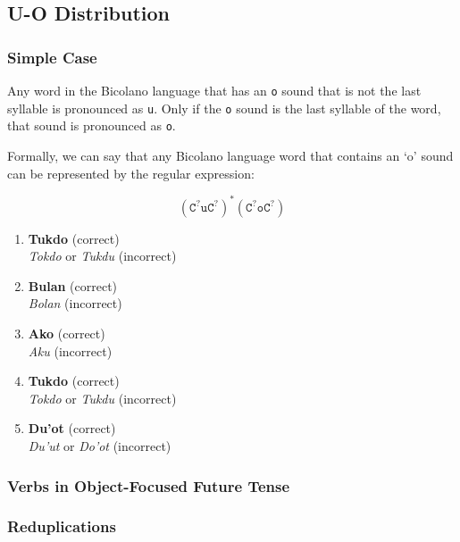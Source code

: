 \subsection{U-O Distribution}

\subsubsection{Simple Case}
Any word in the Bicolano language that has an \texttt{o} sound that is not the last syllable is pronounced as \texttt{u}. Only if the \texttt{o} sound is the last syllable of the word, that sound is pronounced as \texttt{o}. 

Formally, we can say that any Bicolano language word that contains an ‘o’ sound can be represented by the regular expression:

\[
    \left(\texttt{C}^?\texttt{uC}^?\right)^* \left(\texttt{C}^?\texttt{oC}^?\right)
\]

\begin{example}
\end{example}

\begin{enumerate}
    \item \textbf{Tukdo} (correct) \\
    \textit{Tokdo} or \textit{Tukdu} (incorrect) \\
    \item \textbf{Bulan} (correct) \\
    \textit{Bolan} (incorrect) \\
    \item \textbf{Ako} (correct) \\
    \textit{Aku} (incorrect) \\
    \item \textbf{Tukdo} (correct) \\
    \textit{Tokdo} or \textit{Tukdu} (incorrect) \\
    \item \textbf{Du'ot} (correct) \\
    \textit{Du'ut} or \textit{Do'ot} (incorrect) \\
\end{enumerate}

\subsubsection{Verbs in Object-Focused Future Tense}



\subsubsection{Reduplications}



